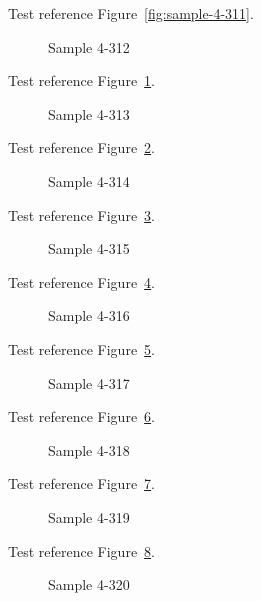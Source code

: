 Test reference Figure~\ref{fig:sample-4-311}.

\begin{figure}[tbhp]
\caption{Sample 4-312}
\label{fig:sample-4-312}
\end{figure}

Test reference Figure~\ref{fig:sample-4-312}.

\begin{figure}[tbhp]
\caption{Sample 4-313}
\label{fig:sample-4-313}
\end{figure}

Test reference Figure~\ref{fig:sample-4-313}.

\begin{figure}[tbhp]
\caption{Sample 4-314}
\label{fig:sample-4-314}
\end{figure}

Test reference Figure~\ref{fig:sample-4-314}.

\begin{figure}[tbhp]
\caption{Sample 4-315}
\label{fig:sample-4-315}
\end{figure}

Test reference Figure~\ref{fig:sample-4-315}.

\begin{figure}[tbhp]
\caption{Sample 4-316}
\label{fig:sample-4-316}
\end{figure}

Test reference Figure~\ref{fig:sample-4-316}.

\begin{figure}[tbhp]
\caption{Sample 4-317}
\label{fig:sample-4-317}
\end{figure}

Test reference Figure~\ref{fig:sample-4-317}.

\begin{figure}[tbhp]
\caption{Sample 4-318}
\label{fig:sample-4-318}
\end{figure}

Test reference Figure~\ref{fig:sample-4-318}.

\begin{figure}[tbhp]
\caption{Sample 4-319}
\label{fig:sample-4-319}
\end{figure}

Test reference Figure~\ref{fig:sample-4-319}.

\begin{figure}[tbhp]
\caption{Sample 4-320}
\label{fig:sample-4-320}
\end{figure}

